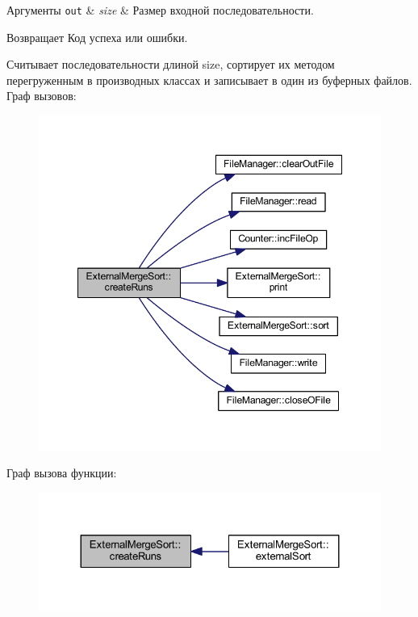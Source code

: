 \begin{DoxyParams}[1]{Аргументы}
\mbox{\tt out}  & {\em size} & Размер входной последовательности. \\
\hline
\end{DoxyParams}
\begin{DoxyReturn}{Возвращает}
Код успеха или ошибки.
\end{DoxyReturn}
Считывает последовательности длиной size, сортирует их методом перегруженным в производных классах и записывает в один из буферных файлов. Граф вызовов\+:\nopagebreak
\begin{figure}[H]
\begin{center}
\leavevmode
\includegraphics[width=348pt]{class_external_merge_sort_aa3ec5ccebe04f02538ee42d0ffe7b75c_cgraph}
\end{center}
\end{figure}
Граф вызова функции\+:\nopagebreak
\begin{figure}[H]
\begin{center}
\leavevmode
\includegraphics[width=324pt]{class_external_merge_sort_aa3ec5ccebe04f02538ee42d0ffe7b75c_icgraph}
\end{center}
\end{figure}
\hypertarget{class_external_merge_sort_aa0d80e41effe3a13c0d63b33e208918f}{}\label{class_external_merge_sort_aa0d80e41effe3a13c0d63b33e208918f} 
